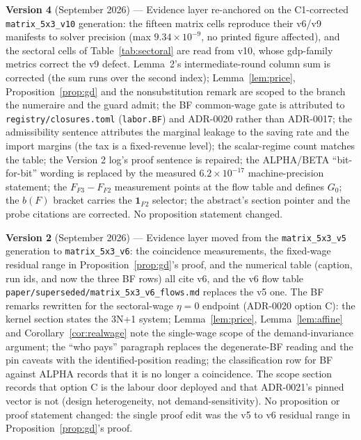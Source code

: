 \documentclass[11pt]{article}
\numberwithin{equation}{section}
\begin{document}
\noindent\textbf{Version 4} \textcolor{revisionV3}{(September 2026)} ---
Evidence layer re-anchored on the C1-corrected \texttt{matrix\_5x3\_v10}
generation: the fifteen matrix cells reproduce their v6/v9 manifests to solver
precision (max $9.34\times10^{-9}$, no printed figure affected), and the
sectoral cells of Table~\ref{tab:sectoral} are read from v10, whose gdp-family
metrics correct the v9 defect. Lemma~2's intermediate-round column sum is
corrected (the sum runs over the second index); Lemma~\ref{lem:price},
Proposition~\ref{prop:gd} and the nonsubstitution remark are scoped to the
branch the numeraire and the guard admit; the BF common-wage gate is attributed
to \texttt{registry/closures.toml} (\texttt{labor.BF}) and ADR-0020 rather than
ADR-0017; the admissibility sentence attributes the marginal leakage to the
saving rate and the import margins (the tax is a fixed-revenue level); the
scalar-regime count matches the table; the Version 2 log's proof sentence is
repaired; the ALPHA/BETA ``bit-for-bit'' wording is replaced by the measured
$6.2\times10^{-17}$ machine-precision statement; the $F_{F3}-F_{F2}$
measurement points at the flow table and defines $G_0$; the $b(F)$ bracket
carries the $\mathbf{1}_{F2}$ selector; the abstract's section pointer and the
probe citations are corrected. No proposition statement changed.

\noindent\textbf{Version 2} \textcolor{revisionV1}{(September 2026)} ---
Evidence layer moved from the \texttt{matrix\_5x3\_v5} generation to
\texttt{matrix\_5x3\_v6}: the coincidence measurements, the fixed-wage
residual range in Proposition~\ref{prop:gd}'s proof, and the numerical table
(caption, run ids, and now the three BF rows) all cite v6, and the v6 flow
table \texttt{paper/superseded/matrix\_5x3\_v6\_flows.md} replaces the v5 one.
The BF remarks rewritten for the sectoral-wage $\eta = 0$ endpoint (ADR-0020
option C): the kernel section states the 3N+1 system; Lemma~\ref{lem:price},
Lemma~\ref{lem:affine} and Corollary~\ref{cor:realwage} note the
single-wage scope of the demand-invariance argument; the ``who pays''
paragraph replaces the degenerate-BF reading and the pin caveats with the
identified-position reading; the classification row for BF against ALPHA
records that it is no longer a coincidence. The scope section records that
option C is the labour door deployed and that ADR-0021's pinned vector is
not (design heterogeneity, not demand-sensitivity). \textcolor{revisionV3}{No
proposition or proof statement changed: the single proof edit was the v5 to v6
residual range in Proposition~\ref{prop:gd}'s proof.}
\end{document}
